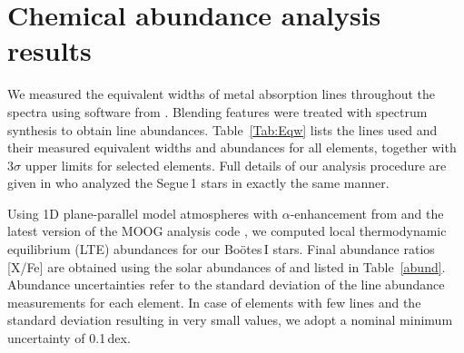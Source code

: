 \documentclass[]{emulateapj}
\begin{document}
\section{Chemical abundance analysis results}\label{sec:analysis}

We measured the equivalent widths of metal absorption lines throughout
the spectra using software from \citet{casey14}. Blending features
were treated with spectrum synthesis to obtain line
abundances. Table~\ref{Tab:Eqw} lists the lines used and their
measured equivalent widths and abundances for all elements, together
with 3$\sigma$ upper limits for selected elements. Full details of our
analysis procedure are given in \citet{frebel14} who analyzed the
Segue\,1 stars in exactly the same manner.


Using 1D plane-parallel model atmospheres with $\alpha$-enhancement
from \citet{castelli_kurucz} and the latest version of the MOOG
analysis code \citep{moog, sobeck11}, we computed local thermodynamic
equilibrium (LTE) abundances for our Bo\"otes\,I stars. Final
abundance ratios [X/Fe] are obtained using the solar abundances of
\citet{asplund09} and listed in Table~\ref{abund}. Abundance
uncertainties refer to the standard deviation of the line abundance
measurements for each element. In case of elements with few lines and
the standard deviation resulting in very small values, we adopt a
nominal minimum uncertainty of 0.1\,dex.
\end{document}
